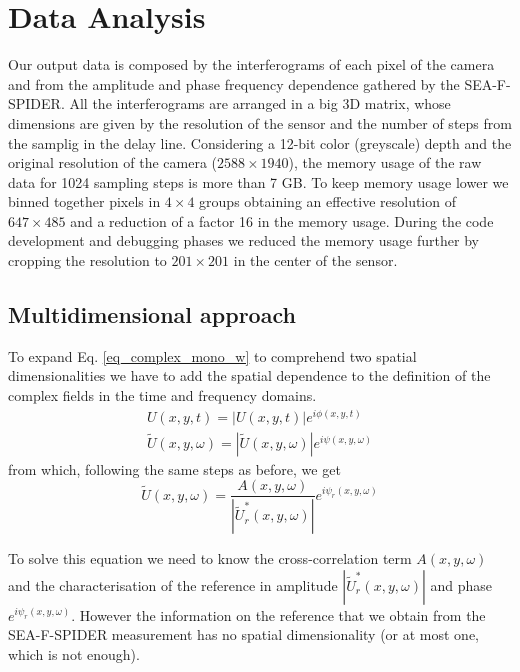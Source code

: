 \documentclass[12pt,a4paper,twoside]{article}
\begin{document}
\section{Data Analysis}
\label{sec_data_analysis}
Our output data is composed by the interferograms of each pixel of the camera and from the amplitude and phase frequency dependence gathered by the SEA-F-SPIDER.
All the interferograms are arranged in a big 3D matrix, whose dimensions are given by the resolution of the sensor and the number of steps from the samplig in the delay line.
Considering a 12-bit color (greyscale) depth and the original resolution of the camera ($2588\times 1940$), the memory usage of the raw data for 1024 sampling steps is more than 7 GB.
To keep memory usage lower we binned together pixels in $4\times 4$ groups obtaining an effective resolution of $647\times 485$ and a reduction of a factor 16 in the memory usage.
During the code development and debugging phases we reduced the memory usage further by cropping the resolution to $201\times 201$ in the center of the sensor.

\subsection{Multidimensional approach}
To expand Eq. \ref{eq_complex_mono_w} to comprehend two spatial dimensionalities we have to add the spatial dependence to the definition of the complex fields in the time and frequency domains.
\begin{gather}
	U(x,y,t) = |U(x,y,t)|e^{i\phi(x,y,t)} \\
	\tilde{U}(x,y,\omega) = |\tilde{U}(x,y,\omega)|e^{i\psi(x,y,\omega)}
	\label{eq_redef}
\end{gather}
from which, following the same steps as before, we get
\begin{equation}
	\tilde{U}(x,y,\omega) = \frac{A(x,y,\omega)}{|\tilde{U}_r^*(x,y,\omega)|}e^{i\psi_r(x,y,\omega)}
\end{equation}

To solve this equation we need to know the cross-correlation term $A(x,y,\omega)$ and the characterisation of the reference in amplitude $|\tilde{U}_r^*(x,y,\omega)|$ and phase $e^{i\psi_r(x,y,\omega)}$.
However the information on the reference that we obtain from the SEA-F-SPIDER measurement has no spatial dimensionality (or at most one, which is not enough).
\end{document}
